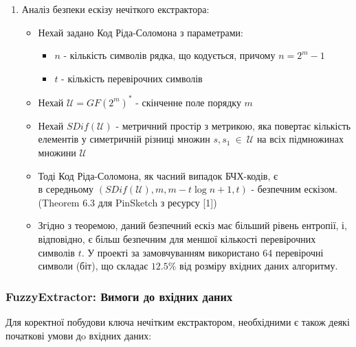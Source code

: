 \documentclass[11pt]{article}
\providecommand{\tightlist}{%
      \setlength{\itemsep}{0pt}\setlength{\parskip}{0pt}}
\begin{document}
    \begin{enumerate}
\def\labelenumi{\arabic{enumi}.}
\setcounter{enumi}{2}
\tightlist
\item
  Аналіз безпеки ескізу нечіткого екстрактора:

  \begin{itemize}
  \tightlist
  \item
    Нехай задано Код Ріда-Соломона з параметрами:

    \begin{itemize}
    \tightlist
    \item
      \(n\) - кількість символів рядка, що кодується, причому
      \(n = 2^m-1\)
    \item
      \(t\) - кількість перевірочних символів
    \end{itemize}
  \item
    Нехай \(\mathscr{U} = GF(2^m)^*\) - скінченне поле порядку \(m\)
  \item
    Нехай \(SDif(\mathscr{U})\) - метричний простір з метрикою, яка
    повертає кількість елементів у симетричній різниці множин
    \(s,s_1~\in~\mathscr{U}\) на всіх підмножинах множини
    \(\mathscr{U}\)
  \item
    Тоді Код Ріда-Соломона, як часний випадок БЧХ-кодів, є\\
    в середньому \((SDif(\mathscr{U}),m,m-t\log{n+1},t)\) - безпечним
    ескізом. (Theorem 6.3 для PinSketch з ресурсу [1])
  \item
    Згідно з теоремою, даний безпечний ескіз має більший рівень
    ентропії, і, відповідно, є більш безпечним для меншої кількості
    перевірочних символів \(t\). У проекті за замовчуванням використано
    64 перевірочні символи (біт), що складає \(12.5\%\) від розміру вхідних
    даних алгоритму.
  \end{itemize}
\end{enumerate}

    \hypertarget{fuzzyextractor-ux432ux438ux43cux43eux433ux438-ux434ux43e-ux432ux445ux456ux434ux43dux438ux445-ux434ux430ux43dux438ux445}{%
\subsubsection{FuzzyExtractor: Вимоги до вхідних
даних}\label{fuzzyextractor-ux432ux438ux43cux43eux433ux438-ux434ux43e-ux432ux445ux456ux434ux43dux438ux445-ux434ux430ux43dux438ux445}}

Для коректної побудови ключа нечітким екстрактором, необхідними є також
деякі початкові умови дo вхідних даних:
\end{document}
